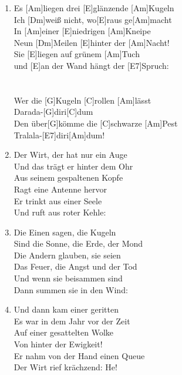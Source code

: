 \def\Titel{Drei glänzende Kugeln}
\def\Interpret{Franz Josef Degenhard}
\def\Referenz{text}

\LiedSetup{}

\begin{guitarMagic}
    \begin{enumerate}
        \item Es [Am]liegen drei [E]glänzende [Am]Kugeln\\
            Ich [Dm]weiß nicht, wo[E]raus ge[Am]macht\\
            In [Am]einer [E]niedrigen [Am]Kneipe\\
            Neun [Dm]Meilen [E]hinter der [Am]Nacht!\\
            Sie [E]liegen auf grünem [Am]Tuch\\
            und [E]an der Wand hängt der [E7]Spruch:\\
            \ \\
            [Refrain]\\
            [F]Wer die [G]Kugeln [C]rollen [Am]lässt\\
            [Dm]Darada-[G]diri[C]dum\\
            [F]Den über[G]kömme die [C]schwarze [Am]Pest\\
            [E]Tralala-[E7]diri[Am]dum!\\


        \item Der Wirt, der hat nur ein Auge\\
            Und das trägt er hinter dem Ohr\\
            \liedweiter
            Aus seinem gespaltenen Kopfe\\
            Ragt eine Antenne hervor\\
            Er trinkt aus einer Seele\\
            Und ruft aus roter Kehle:

        \item Die Einen sagen, die Kugeln\\
            Sind die Sonne, die Erde, der Mond\\
            Die Andern glauben, sie seien\\
            Das Feuer, die Angst und der Tod\\
            Und wenn sie beisammen sind\\
            Dann summen sie in den Wind:

        \item Und dann kam einer geritten\\
            Es war in dem Jahr vor der Zeit\\
            Auf einer gesattelten Wolke\\
            Von hinter der Ewigkeit!\\
            Er nahm von der Hand einen Queue\\
            Der Wirt rief krächzend: He!


\end{enumerate}
\end{guitarMagic}
